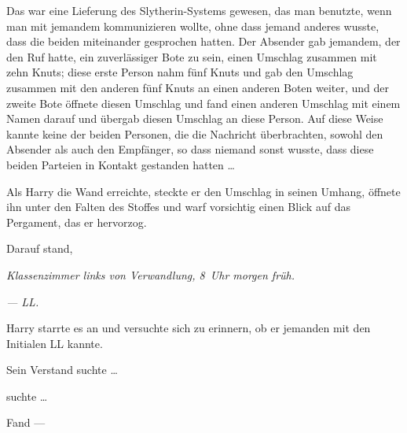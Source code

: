 Das war eine Lieferung des Slytherin-Systems gewesen, das man benutzte, wenn man mit jemandem kommunizieren wollte, ohne dass jemand anderes wusste, dass die beiden miteinander gesprochen hatten. Der Absender gab jemandem, der den Ruf hatte, ein zuverlässiger Bote zu sein, einen Umschlag zusammen mit zehn Knuts; diese erste Person nahm fünf Knuts und gab den Umschlag zusammen mit den anderen fünf Knuts an einen anderen Boten weiter, und der zweite Bote öffnete diesen Umschlag und fand einen anderen Umschlag mit einem Namen darauf und übergab diesen Umschlag an diese Person. Auf diese Weise kannte keine der beiden Personen, die die Nachricht überbrachten, sowohl den Absender als auch den Empfänger, so dass niemand sonst wusste, dass diese beiden Parteien in Kontakt gestanden hatten …

Als Harry die Wand erreichte, steckte er den Umschlag in seinen Umhang, öffnete ihn unter den Falten des Stoffes und warf vorsichtig einen Blick auf das Pergament, das er hervorzog.

Darauf stand,

\emph{Klassenzimmer links von Verwandlung, 8~Uhr morgen früh.}

\emph{— LL.}

Harry starrte es an und versuchte sich zu erinnern, ob er jemanden mit den Initialen LL kannte.

Sein Verstand suchte …

suchte …

Fand —

